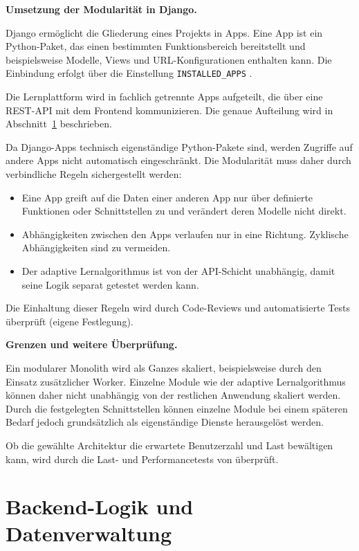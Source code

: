 \textbf{Umsetzung der Modularität in Django.}

Django ermöglicht die Gliederung eines Projekts in Apps. Eine App ist ein Python-Paket, das einen bestimmten Funktionsbereich bereitstellt und beispielsweise Modelle, Views und URL-Konfigurationen enthalten kann. Die Einbindung erfolgt über die Einstellung \texttt{INSTALLED\_APPS} \parencite{djangoApplications}.

Die Lernplattform wird in fachlich getrennte Apps aufgeteilt, die über eine REST-API mit dem Frontend kommunizieren. Die genaue Aufteilung wird in Abschnitt~\ref{sec:backend-logik} beschrieben.

Da Django-Apps technisch eigenständige Python-Pakete sind, werden Zugriffe auf andere Apps nicht automatisch eingeschränkt. Die Modularität muss daher durch verbindliche Regeln sichergestellt werden:

\begin{itemize}
    \item Eine App greift auf die Daten einer anderen App nur über definierte Funktionen oder Schnittstellen zu und verändert deren Modelle nicht direkt.
    \item Abhängigkeiten zwischen den Apps verlaufen nur in eine Richtung. Zyklische Abhängigkeiten sind zu vermeiden.
    \item Der adaptive Lernalgorithmus ist von der API-Schicht unabhängig, damit seine Logik separat getestet werden kann.
\end{itemize}

Die Einhaltung dieser Regeln wird durch Code-Reviews und automatisierte Tests überprüft (eigene Festlegung).

\textbf{Grenzen und weitere Überprüfung.}

Ein modularer Monolith wird als Ganzes skaliert, beispielsweise durch den Einsatz zusätzlicher Worker. Einzelne Module wie der adaptive Lernalgorithmus können daher nicht unabhängig von der restlichen Anwendung skaliert werden. Durch die festgelegten Schnittstellen können einzelne Module bei einem späteren Bedarf jedoch grundsätzlich als eigenständige Dienste herausgelöst werden.

Ob die gewählte Architektur die erwartete Benutzerzahl und Last bewältigen kann, wird durch die Last- und Performancetests von \Jai überprüft.
\section{Backend-Logik und Datenverwaltung}
\label{sec:backend-logik}

